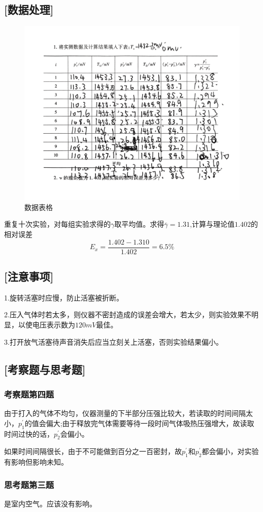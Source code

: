 \documentclass[UTF8]{article}
\begin{document}
	\subsection*{[数据处理]}
	\par
		\begin{figure}[h]
		\centering
		\includegraphics[width=0.7\linewidth]{数据表格}
		\caption{数据表格}
	\end{figure} 重复十次实验，对每组实验求得的$\gamma$取平均值。求得$\overline{\gamma}=1.31$,计算与理论值$1.402$的相对误差
	\[E_{x} = \frac{1.402-1.310}{1.402}=6.5\%\]

	\subsection*{[注意事项]}
	\par 1.旋转活塞时应慢，防止活塞被折断。
	\par 2.压入气体时若太多，则仪器不密封造成的误差会增大，若太少，则实验效果不明显，以使电压表示数为$120mV$最佳。
	\par 3.打开放气活塞待声音消失后应当立刻关上活塞，否则实验结果偏小。
	\subsection*{[考察题与思考题]}
	\subsubsection*{考察题第四题}
	\par 由于打入的气体不均匀，仪器测量的下半部分压强比较大，若读取的时间间隔太小，$p_1^{\prime}$的值会偏大;由于释放完气体需要等待一段时间气体吸热压强增大，故读取时间过快的话，$p_2^{\prime}$会偏小。
	\par 如果时间间隔很长，由于不可能做到百分之一百密封，故$p_1^{\prime}和p_2^{\prime}$都会偏小，对实验有影响但影响未知。
	\subsubsection*{思考题第三题}
	\par 是室内空气。应该没有影响。
\end{document}
